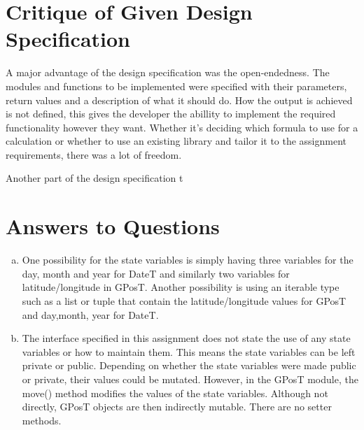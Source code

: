 \documentclass[12pt]{article}
\begin{document}
\section{Critique of Given Design Specification}

A major advantage of the design specification was the open-endedness. The modules and functions to be implemented were specified with their parameters, return values and a description of what it should do. How the output is achieved is not defined, this gives the developer the abillity to implement the required functionality however they want. Whether it's deciding which formula to use for a calculation or whether to use an existing library and tailor it to the assignment requirements, there was a lot of freedom. 

Another part of the design specification t

\section{Answers to Questions}

\begin{enumerate}[(a)]

\item One possibility for the state variables is simply having three variables for the day, month and year for DateT and similarly two variables for latitude/longitude in GPosT. Another possibility is using an iterable type such as a list or tuple that contain the latitude/longitude values for GPosT and day,month, year for DateT.

\item The interface specified in this assignment does not state the use of any state variables or how to maintain them. This means the state variables can be left private or public. Depending on whether the state variables were made public or private, their values could be mutated. However, in the GPosT module, the move() method modifies the values of the state variables. Although not directly, GPosT objects are then indirectly mutable. There are no setter methods. 

\end{enumerate}

\newpage

\lstset{language=Python, basicstyle=\tiny, breaklines=true, showspaces=false,
  showstringspaces=false, breakatwhitespace=true}

\def\thesection{\Alph{section}}
\end{document}
